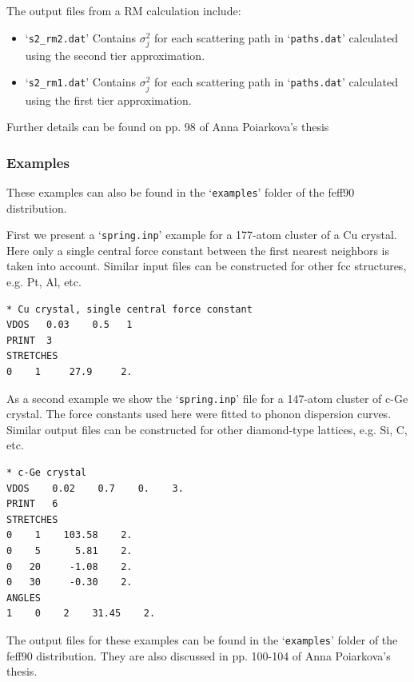 \documentclass[11pt,oneside]{report} %
\renewcommand{\htmlref}[2]{\hyperlink{#2}{#1}}
\newcommand{\file}[1]{`\texttt{#1}'}
\renewcommand{\htmlref}[2]{{#1}} %
\begin{document}
The output files from a RM calculation include:
\begin{itemize}
\item \file{s2\_rm2.dat}  Contains $\sigma_j^2$ for each scattering path in \file{paths.dat} calculated using the second tier approximation.
\item \file{s2\_rm1.dat}  Contains $\sigma_j^2$ for each scattering path in \file{paths.dat} calculated using the first tier approximation.
\end{itemize}

Further details can be found on pp. 98 of  \htmlref{Anna Poiarkova's thesis}{http://leonardo.phys.washington.edu/feff/papers/dissertations/thesis_poiarkova.ps}

\subsubsection{Examples}

These examples can also be found in the \file{examples} folder of the feff90 distribution.

First we present a \file{spring.inp} example for a 177-atom cluster of a Cu crystal.  Here only a single central force constant between the first nearest neighbors is taken into account.  Similar input files can be constructed for other fcc structures, e.g. Pt, Al, etc.
\begin{verbatim}
* Cu crystal, single central force constant
VDOS   0.03    0.5   1
PRINT  3
STRETCHES
0    1     27.9     2.
\end{verbatim}


As a second example we show the \file{spring.inp} file for a 147-atom cluster of c-Ge crystal.  The force constants used here were fitted to phonon dispersion curves.  Similar output files can be constructed for other diamond-type lattices, e.g. Si, C, etc.
\begin{verbatim}
* c-Ge crystal
VDOS    0.02    0.7    0.    3.
PRINT   6
STRETCHES
0    1    103.58    2.
0    5      5.81    2.
0   20     -1.08    2.
0   30     -0.30    2.
ANGLES
1    0    2    31.45    2.
\end{verbatim}

The output files for these examples can be found in the \file{examples} folder of the feff90 distribution.  They are also discussed in pp. 100-104 of  \htmlref{Anna Poiarkova's thesis}{http://leonardo.phys.washington.edu/feff/papers/dissertations/thesis_poiarkova.ps}.
\end{document}
